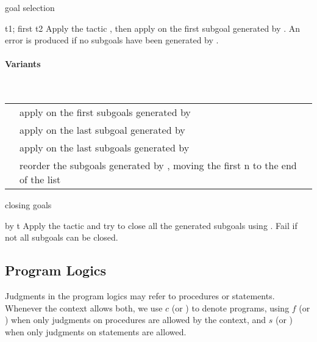 \begin{tactic}[t1; first t2]{goal selection}
  \begin{tsyntax}[empty]{t1; first t2}
  Apply the tactic , then apply  on the first subgoal
  generated by . An error is produced if no subgoals have been
  generated by .

  \paragraph{Variants}\strut\\

  \noindent\begin{tabularx}{\textwidth}{@{}ll@{}}
  {\tct{t1; first n t2}} & apply {\tct{t2}} on the first {\tct{n}} subgoals
    generated by {\tct{t1}}\\
  {\tct{t1; last t2}} & apply {\tct{t2}} on the last subgoal
    generated by {\tct{t1}}\\
  {\tct{t1; last n t2}} & apply {\tct{t2}} on the last {\tct{n}} subgoals
    generated by {\tct{t1}}\\
  {\tct{t; first n last}} & \parbox{200pt}{reorder the subgoals generated by {}, moving
    the first n to the end of the list}
  \end{tabularx}
  \end{tsyntax}
\end{tactic}

\begin{tactic}[by t]{closing goals}
  \begin{tsyntax}[empty]{by t}
  Apply the tactic  and try to close all the generated subgoals using
  . Fail if not all subgoals can be closed.
  \end{tsyntax}
\end{tactic}

\subsection{Program Logics}

Judgments in the program logics may refer to procedures or
statements. Whenever the context allows both, we use $c$ (or )
to denote programs, using $f$ (or ) when only judgments on
procedures are allowed by the context, and $s$ (or ) when only
judgments on statements are allowed.

